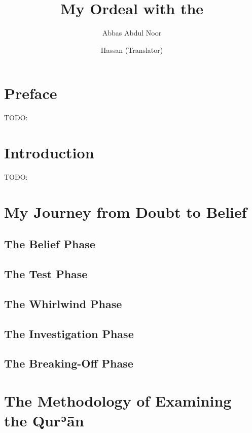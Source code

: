\documentclass[12pt]{book}
\title{My Ordeal with the \Quran}
\author{Abbas Abdul Noor \and Hassan (Translator)}
\def \Quran{Qurʾān} %
\begin{document}
\frontmatter

\maketitle

\setcounter{page}{1}
\tableofcontents

\chapter{Preface}
TODO:

\chapter{Introduction}
TODO:

\mainmatter


\chapter{My Journey from Doubt to Belief}

\section{The Belief Phase}

\section{The Test Phase}

\section{The Whirlwind Phase}

\section{The Investigation Phase}

\section{The Breaking-Off Phase}

\chapter{The Methodology of Examining the \Quran}
\end{document}

